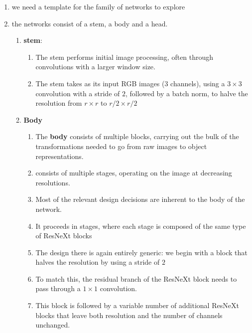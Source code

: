\begin{enumerate}
    \item we need a template for the family of networks to explore

    \item the networks consist of a stem, a body and a head.
    \begin{enumerate}
        \item \textbf{stem}:
        \begin{enumerate}
            \item The {stem} performs initial image processing, often through convolutions with a larger window size.

            \item The stem takes as its input RGB images (3 channels), using a $3 \times 3$ convolution with a stride of $2$, followed by a batch norm, to halve the resolution from $r \times r$ to $r/2 \times r/2$

        \end{enumerate}

        \item \textbf{Body}
        \begin{enumerate}
            \item The \textbf{body} consists of multiple blocks, carrying out the bulk of the transformations needed to go from raw images to object representations.

            \item consists of multiple stages, operating on the image at decreasing resolutions.

            \item Most of the relevant design decisions are inherent to the body of the network. 
            
            \item It proceeds in stages, where each stage is composed of the same type of ResNeXt blocks

            \item The design there is again entirely generic: we begin with a block that halves the resolution by using a stride of $2$

            \item To match this, the residual branch of the ResNeXt block needs to pass through a $1 \times 1$ convolution. 
            
            \item This block is followed by a variable number of additional ResNeXt blocks that leave both resolution and the number of channels unchanged.


\end{enumerate}
\end{enumerate}
\end{enumerate}
